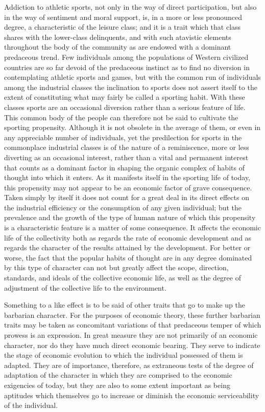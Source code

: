 \documentclass[12pt]{report}
\begin{document}
Addiction to athletic sports, not only in the way of direct
participation, but also in the way of sentiment and moral support, is,
in a more or less pronounced degree, a characteristic of the leisure
class; and it is a trait which that class shares with the lower-class
delinquents, and with such atavistic elements throughout the body of
the community as are endowed with a dominant predaceous trend. Few
individuals among the populations of Western civilized countries are
so far devoid of the predaceous instinct as to find no diversion in
contemplating athletic sports and games, but with the common run of
individuals among the industrial classes the inclination to sports
does not assert itself to the extent of constituting what may fairly
be called a sporting habit. With these classes sports are an occasional
diversion rather than a serious feature of life. This common body of the
people can therefore not be said to cultivate the sporting propensity.
Although it is not obsolete in the average of them, or even in any
appreciable number of individuals, yet the predilection for sports in
the commonplace industrial classes is of the nature of a reminiscence,
more or less diverting as an occasional interest, rather than a vital
and permanent interest that counts as a dominant factor in shaping
the organic complex of habits of thought into which it enters. As it
manifests itself in the sporting life of today, this propensity may not
appear to be an economic factor of grave consequence. Taken simply by
itself it does not count for a great deal in its direct effects on the
industrial efficiency or the consumption of any given individual; but
the prevalence and the growth of the type of human nature of which this
propensity is a characteristic feature is a matter of some consequence.
It affects the economic life of the collectivity both as regards the
rate of economic development and as regards the character of the results
attained by the development. For better or worse, the fact that the
popular habits of thought are in any degree dominated by this type of
character can not but greatly affect the scope, direction, standards,
and ideals of the collective economic life, as well as the degree of
adjustment of the collective life to the environment.

Something to a like effect is to be said of other traits that go to make
up the barbarian character. For the purposes of economic theory, these
further barbarian traits may be taken as concomitant variations of that
predaceous temper of which prowess is an expression. In great measure
they are not primarily of an economic character, nor do they have much
direct economic bearing. They serve to indicate the stage of economic
evolution to which the individual possessed of them is adapted. They
are of importance, therefore, as extraneous tests of the degree of
adaptation of the character in which they are comprised to the economic
exigencies of today, but they are also to some extent important as
being aptitudes which themselves go to increase or diminish the economic
serviceability of the individual.
\end{document}
